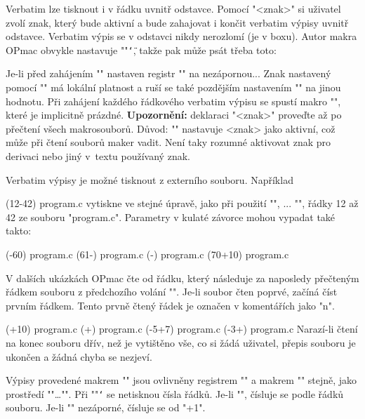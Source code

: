 Verbatim lze tisknout i v řádku uvnitř odstavce. Pomocí "\activettchar<znak>" si
uživatel zvolí znak, který bude aktivní a bude zahajovat i končit verbatim
výpisy uvnitř odstavce. Verbatim výpis se v odstavci nikdy nerozlomí (je v
boxu). Autor makra OPmac obvykle nastavuje 
"\activettchar"{\tt\char`\"}, takže pak může psát třeba toto:

\begtt
Je-li před zahájením "\begtt" nastaven registr "\ttline" na nezápornou...
\endtt
%
Znak nastavený pomocí "\activettchar" má lokální platnost a ruší se také
pozdějším nastavením "\activettchar" na jinou hodnotu. Při zahájení každého
řádkového verbatim výpisu se spustí makro "\intthook", které je implicitně
prázdné. {\bf Upozornění:} deklaraci "\activettchar<znak>" proveďte až po přečtení všech
makrosouborů. Důvod: "\activettchar" nastavuje <znak> jako aktivní, což může při
čtení souborů maker vadit. Není taky rozumné aktivovat znak pro derivaci nebo jiný
v~textu používaný znak.

Verbatim výpisy je možné tisknout z externího souboru. Například

\begtt
\verbinput (12-42) program.c
\endtt
%
vytiskne ve stejné úpravě, jako při použití "\begtt", ... "\endtt", 
řádky 12 až 42 ze souboru "program.c". 
Parametry v kulaté závorce mohou vypadat také takto:

\begtt
\verbinput (-60) program.c   % výpis od začátku souboru do řádku 60
\verbinput (61-) program.c   % výpis od řádku 61 do konce souboru
\verbinput (-) program.c     % výpis celého souboru
\verbinput (70+10) program.c % výpis od řádku 70, tiskne 10 řádků
\endtt

V dalších ukázkách OPmac čte od řádku, který následuje za naposledy
přečteným řádkem souboru z předchozího volání "\verbinput". Je-li soubor
čten poprvé, začíná číst prvním řádkem. Tento prvně čtený 
řádek je označen v komentářích jako "n".

\begtt
\verbinput (+10) program.c  % výpis deseti řádků od řádku n
\verbinput (+) program.c    % výpis od řádku n do konce souboru
\vebrinput (-5+7) program.c %
\verbinput (-3+) program.c  % vynechá 3 řádky, tiskne do konce souboru
\endtt
%
Narazí-li čtení na konec souboru dřív, než je vytištěno vše, co si žádá
uživatel, přepis souboru je ukončen a žádná chyba se nezjeví. 

Výpisy provedené makrem "\verbinput" jsou ovlivněny registrem
"\ttindent" a makrem "\tthook" stejně, jako prostředí "\begtt"\dots"\endtt".
Při "\ttline"{\tt\char`} se netisknou čísla řádků. Je-li "", čísluje se podle
řádků souboru. Je-li "\ttline" nezáporné, čísluje se od "\ttline+1".



